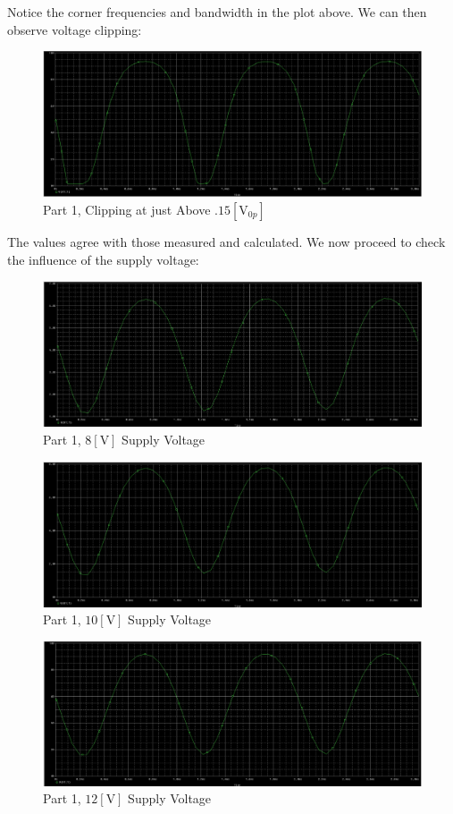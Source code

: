 \documentclass[
	letterpaper, %
	10pt, %
]{CSUniSchoolLabReport}
\begin{document}
Notice the corner frequencies and bandwidth in the plot above. We can then observe voltage clipping:

\begin{figure}[H]
  \centering
  \includegraphics[width=.8\textwidth]{Figures/L4F9}
  \caption{Part 1, Clipping at just Above $.15[\si{\volt}_{0p}]$}
  \label{fig:11}
\end{figure}

The values agree with those measured and calculated. We now proceed to check the influence of the supply voltage:

\begin{figure}[H]
  \centering
  \includegraphics[width=.8\textwidth]{Figures/L4F10}
  \caption{Part 1, $8[\si{\volt}]$ Supply Voltage}
  \label{fig:12}
\end{figure}

\begin{figure}[H]
  \centering
  \includegraphics[width=.8\textwidth]{Figures/L4F11}
  \caption{Part 1, $10[\si{\volt}]$ Supply Voltage}
  \label{fig:13}
\end{figure}

\begin{figure}[H]
  \centering
  \includegraphics[width=.8\textwidth]{Figures/L4F12}
  \caption{Part 1, $12[\si{\volt}]$ Supply Voltage}
  \label{fig:14}
\end{figure}
\end{document}
